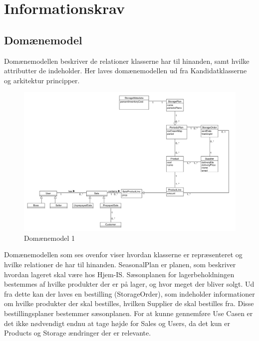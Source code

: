 \section{Informationskrav}\label{sec:informations-krav}

\subsection{Domænemodel}\label{Domainmodel}
Domænemodellen beskriver de relationer klasserne har til hinanden, samt hvilke attributter de indeholder. Her laves domænemodellen ud fra Kandidatklasserne og arkitektur principper.

\begin{landscape}
\begin{figure}[p]
    \centering
    \includegraphics[width=0.9\hsize]{figures/krav/domain_model_1.png}
    \caption{Domænemodel 1}
    \label{fig:domain_model}
\end{figure}
\end{landscape}

Domænemodellen som ses ovenfor viser hvordan klasserne er repræsenteret og hvilke relationer de har til hinanden. SeasonalPlan er planen, som beskriver hvordan lageret skal være hos Hjem-IS. Sæsonplanen for lagerbeholdningen bestemmes af hvilke produkter der er på lager, og hvor meget der bliver solgt. Ud fra dette kan der laves en bestilling (StorageOrder), som indeholder informationer om hvilke produkter der skal bestilles, hvilken Supplier de skal bestilles fra. Disse bestillingsplaner bestemmer sæsonplanen.
For at kunne gennemføre Use Casen er det ikke nødvendigt endnu at tage højde for Sales og Users, da det kun er Products og Storage ændringer der er relevante. 

